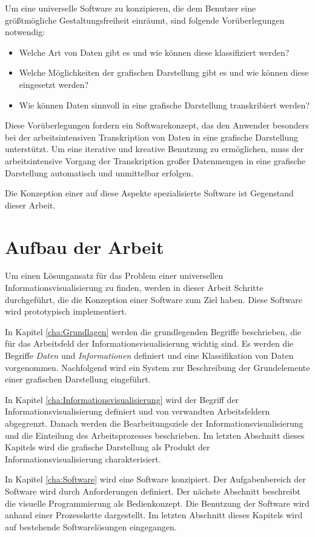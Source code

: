 \documentclass[a4paper, 
               12pt,
               DIV=calc,
               version=first,
               pdftex,
               headsepline,
               footsepline,
               bibtotocnumbered,
               liststotocnumbered]{scrreprt}
\begin{document}
Um eine universelle Software zu konzipieren, die dem Benutzer eine größtmögliche
Gestaltungsfreiheit einräumt, sind folgende Vorüberlegungen notwendig:
\begin{itemize}
\item{Welche Art von Daten gibt es und wie können diese klassifiziert werden?}
\item{Welche Möglichkeiten der grafischen Darstellung gibt es und wie können diese eingesetzt werden?}
\item{Wie können Daten sinnvoll in eine grafische Darstellung transkribiert werden?}
\end{itemize}
Diese Vorüberlegungen fordern ein Softwarekonzept, das den Anwender besonders bei der 
arbeitsintensiven Transkription
von Daten in eine grafische Darstellung unterstützt.
Um eine iterative und kreative Benutzung zu ermöglichen, muss der arbeitsintensive Vorgang
der Transkription großer Datenmengen in eine grafische Darstellung
automatisch und unmittelbar erfolgen.

Die Konzeption einer auf diese Aspekte spezialisierte Software ist Gegenstand dieser Arbeit.
\section{Aufbau der Arbeit}
Um einen Lösungansatz für das Problem einer universellen Informationsvisualisierung
zu finden, werden in dieser Arbeit Schritte durchgeführt, die die Konzeption einer Software zum Ziel haben.
Diese Software wird prototypisch implementiert.

In Kapitel \ref{cha:Grundlagen} werden die grundlegenden Begriffe beschrieben, die für
das Arbeitsfeld der Informationsvisualisierung wichtig sind. Es werden die Begriffe
\textit{Daten} und \textit{Informationen} definiert und eine Klassifikation von Daten vorgenommen.
Nachfolgend wird ein System zur Beschreibung der Grundelemente einer grafischen Darstellung
eingeführt. 

In Kapitel \ref{cha:Informationsvisualisierung} wird der Begriff der Informationsvisualisierung
definiert und von verwandten Arbeitsfeldern abgegrenzt. Danach werden die Bearbeitungsziele
der Informationsvisualisierung und die Einteilung des Arbeitsprozesses
beschrieben. Im letzten Abschnitt dieses Kapitels wird die grafische Darstellung als Produkt
der Informationsvisualisierung charakterisiert.

In Kapitel \ref{cha:Software} wird eine Software konzipiert.
Der Aufgabenbereich der Software wird durch Anforderungen definiert. Der nächste Abschnitt beschreibt
die visuelle Programmierung als Bedienkonzept. Die Benutzung der Software wird anhand einer
Prozesskette dargestellt. Im letzten Abschnitt dieses Kapitels wird auf bestehende Softwarelösungen
eingegangen.
\end{document}
